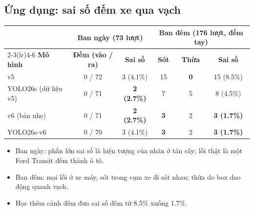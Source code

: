 \documentclass[aspectratio=\mlwAspectRatio, \mlwBaseSize, t]{beamer}
\begin{document}
\subsection{Ứng dụng: sai số đếm xe qua vạch}
\begin{frame}{\stitle}
  \centering
  \small
  \begin{tabular}{@{}lccccc@{}}
    \toprule
    & \multicolumn{2}{c}{\textbf{Ban ngày (73 lượt)}} & \multicolumn{3}{c}{\textbf{Ban đêm (176 lượt, đếm tay)}} \\
    \cmidrule(lr){2-3}\cmidrule(lr){4-6}
    \textbf{Mô hình} & \textbf{Đếm (vào / ra)} & \textbf{Sai số} & \textbf{Sót} & \textbf{Thừa} & \textbf{Sai số} \\
    \midrule
    v5 & 0 / 72 & 3 (4.1\%) & 15 & \textbf{0} & 15 (8.5\%) \\
    YOLO26s (dữ liệu v5) & 0 / 71 & \textbf{2 (2.7\%)} & 7 & 5 & 8 (4.5\%) \\
    v6 (bản nhẹ) & 0 / 71 & \textbf{2 (2.7\%)} & \textbf{3} & 2 & \textbf{3 (1.7\%)} \\
    \rowcolor{HiRow}
    YOLO26s-v6 & 0 / 70 & 3 (4.1\%) & \textbf{3} & 2 & \textbf{3 (1.7\%)} \\
    \bottomrule
  \end{tabular}\par
  \vspace{0.5em}
  \begin{itemize}
    \item Ban ngày: phần lớn sai số là hiện tượng của nhãn ở tán cây; lỗi thật là một Ford Transit đếm thành ô tô.
    \item Ban đêm: mọi lỗi ở xe máy, sót trong \alert{cụm xe đi sát nhau}; thừa do box dao động quanh vạch.
    \item Học thêm cảnh đêm đưa sai số đêm từ 8.5\% xuống \alert{1.7\%}.
  \end{itemize}
\end{frame}
\end{document}
